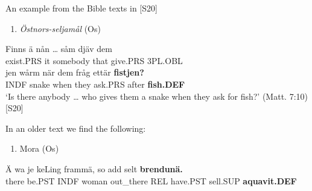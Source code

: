 An example from the Bible texts in [S20]\textstyleLinguisticExample{:}

\begin{enumerate} %
\item 
\label{bkm:Ref123968060}\textit{Östnors-seljamål} (Os)
\end{enumerate} %
\ea\label{}
\gll Finns  ä  nån  …  såm  djäv  dem\\


exist.PRS  it  somebody    that  give.PRS  3PL.OBL\\ %


\ea\label{}
\gll jen  wårm  när  dem  fråg  ettär  \textbf{fistjen?}\\


INDF  snake  when  they  ask.PRS  after  \textbf{fish.DEF}\\ %


‘Is there anybody … who gives them a snake when they ask for fish?’ (Matt. 7:10) [S20]
\z

In an older text we find the following:

\begin{enumerate} %
\item 
\label{bkm:Ref123968062}Mora (Os)

\end{enumerate} %
\ea\label{}
\gll Ä  wa  je  keLing  frammä,  so  add  selt  \textbf{brendunä.}\\


there  be.PST  INDF  woman  out\_there  REL  have.PST  sell.SUP  \textbf{aquavit.DEF}\\ %


